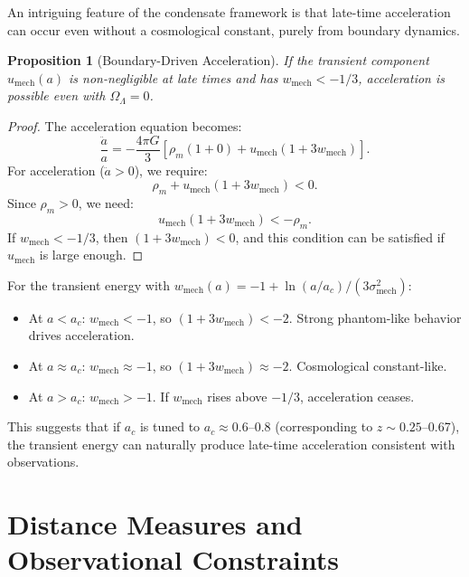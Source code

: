 \documentclass[11pt,a4paper]{article}
\newcommand{\umech}{\ensuremath{u_{\mathrm{mech}}}}
\newcommand{\wmech}{\ensuremath{w_{\mathrm{mech}}}}
\newcommand{\OmegaLam}{\ensuremath{\Omega_\Lambda}}
\newtheorem{proposition}[theorem]{Proposition}
\theoremstyle{definition}
\theoremstyle{remark}
\begin{document}
An intriguing feature of the condensate framework is that late-time acceleration can occur even without a cosmological constant, purely from boundary dynamics.

\begin{proposition}[Boundary-Driven Acceleration]
\label{prop:boundary_acceleration}
If the transient component $\umech(a)$ is non-negligible at late times and has $\wmech < -1/3$, acceleration is possible even with $\OmegaLam = 0$.
\end{proposition}

\begin{proof}
The acceleration equation becomes:
\begin{equation}
\frac{\ddot{a}}{a} = -\frac{4\pi G}{3}\left[\rho_m(1 + 0) + \umech(1 + 3\wmech)\right].
\end{equation}
For acceleration ($\ddot{a} > 0$), we require:
\begin{equation}
\rho_m + \umech(1 + 3\wmech) < 0.
\end{equation}
Since $\rho_m > 0$, we need:
\begin{equation}
\umech(1 + 3\wmech) < -\rho_m.
\end{equation}
If $\wmech < -1/3$, then $(1 + 3\wmech) < 0$, and this condition can be satisfied if $\umech$ is large enough. \qedhere
\end{proof}

For the transient energy with $\wmech(a) = -1 + \ln(a/a_c)/(3\sigma_{\mathrm{mech}}^2)$:
\begin{itemize}[leftmargin=*, itemsep=0.2em]
\item At $a < a_c$: $\wmech < -1$, so $(1 + 3\wmech) < -2$. Strong phantom-like behavior drives acceleration.
\item At $a \approx a_c$: $\wmech \approx -1$, so $(1 + 3\wmech) \approx -2$. Cosmological constant-like.
\item At $a > a_c$: $\wmech > -1$. If $\wmech$ rises above $-1/3$, acceleration ceases.
\end{itemize}

This suggests that if $a_c$ is tuned to $a_c \approx 0.6$--0.8 (corresponding to $z \sim 0.25$--0.67), the transient energy can naturally produce late-time acceleration consistent with observations.

\section{Distance Measures and Observational Constraints}
\label{sec:distance_measures}
\end{document}
